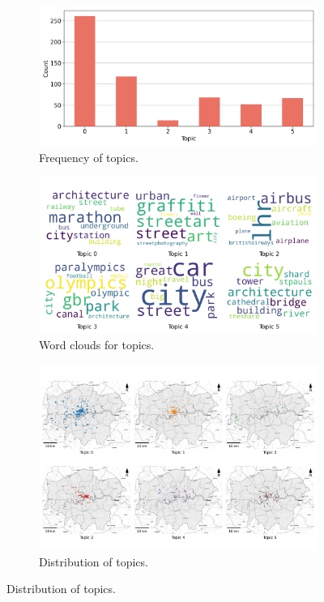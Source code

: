 \documentclass{article}
\theoremstyle{remark}
\begin{document}
\begin{figure}[!h]
    \centering
    \begin{subfigure}{0.45\textwidth}
        \centering
        \includegraphics[width=\linewidth]{figures/places_sense_weekend_tourists.png} 
        \caption{Frequency of topics.}
        \label{fig:places_sense_weekend_tourists}
    \end{subfigure}
    \hfill
    \begin{subfigure}{0.5\textwidth}
        \centering
        \includegraphics[width=\linewidth]{figures/topics_weekend_tourists.png} 
        \caption{Word clouds for topics.}
        \label{fig:topics_weekend_tourists}
    \end{subfigure}
    
    \begin{subfigure}{0.9\textwidth}
        \centering
        \includegraphics[width=\linewidth]{figures/topics_distribution_weekend_tourists.png} 
        \caption{Distribution of topics.}
        \label{fig:topics_distribution_weekend_tourists}
    \end{subfigure}


\end{figure}
\end{document}
